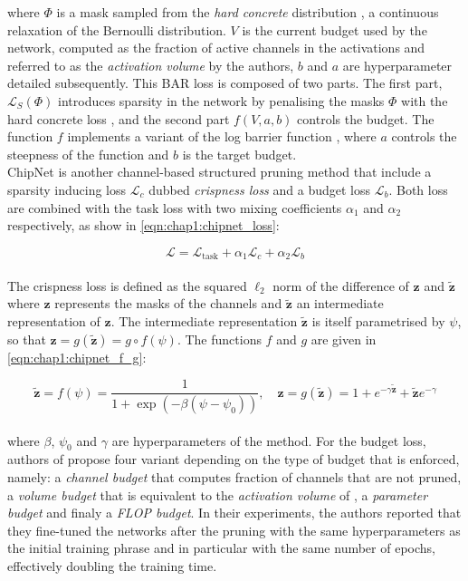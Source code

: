 \noindent where $\Phi$ is a mask sampled from the \emph{hard concrete}
distribution \cite{louizos2017learning}, a continuous relaxation of the
Bernoulli distribution. $V$ is the current budget used by the network, computed
as the fraction of active channels in the activations and referred to as the
\emph{activation volume} by the authors, $b$ and $a$ are hyperparameter detailed
subsequently. This BAR loss is composed of two parts. The first part,
$\mathcal{L}_S(\Phi)$ introduces sparsity in the network by penalising the masks
$\Phi$ with the hard concrete loss \cite{louizos2017learning}, and the second
part $f(V,a,b)$ controls the budget. The function $f$ implements a variant of
the log barrier function \cite{boyd2004convex}, where $a$ controls the steepness
of the function and $b$ is the target budget.\\

ChipNet \cite{tiwari2021chipnet} is another channel-based structured pruning
method that include a sparsity inducing loss $\mathcal{L}_c$ dubbed
\emph{crispness loss} and a budget loss $\mathcal{L}_b$. Both loss are combined
with the task loss with two mixing coefficients $\alpha_1$ and $\alpha_2$
respectively, as show in \cref{eqn:chap1:chipnet_loss}:

\begin{equation}
  \label{eqn:chap1:chipnet_loss}
  \mathcal{L} = \mathcal{L}_{\text{task}} + \alpha_1 \mathcal{L}_c + \alpha_2 \mathcal{L}_b
\end{equation}\\

The crispness loss is defined as the squared $\ell_2$ norm of the difference of
$\mathbf{z}$ and $\tilde{\mathbf{z}}$ where $\mathbf{z}$ represents the masks of
the channels and $\tilde{\mathbf{z}}$ an intermediate representation of
$\mathbf{z}$. The intermediate representation $\tilde{\mathbf{z}}$ is itself
parametrised by $\psi$, so that $\mathbf{z}=g(\tilde{\mathbf{z}})=g \circ
f(\psi)$. The functions $f$ and $g$ are given in \cref{eqn:chap1:chipnet_f_g}:

\begin{equation}
  \label{eqn:chap1:chipnet_f_g}
  \tilde{\mathbf{z}} = f(\psi) = \frac{1}{1 + \exp(-\beta(\psi-\psi_0))}, \quad \mathbf{z} = g(\tilde{\mathbf{z}}) = 1 + e^{-\gamma\tilde{\mathbf{z}}} + \tilde{\mathbf{z}}e^{-\gamma}
\end{equation}\\

\noindent where $\beta$, $\psi_0$ and $\gamma$ are hyperparameters of the
method. For the budget loss, authors of \cite{tiwari2021chipnet} propose four
variant depending on the type of budget that is enforced, namely: a
\emph{channel budget} that computes fraction of channels that are not pruned, a
\emph{volume budget} that is equivalent to the \emph{activation volume} of
\cite{lemaire2019structured}, a \emph{parameter budget} and finaly a
\emph{\ac{FLOP} budget}. In their experiments, the authors reported that they
fine-tuned the networks after the pruning with the same hyperparameters as the
initial training phrase and in particular with the same number of epochs,
effectively doubling the training time.\\

